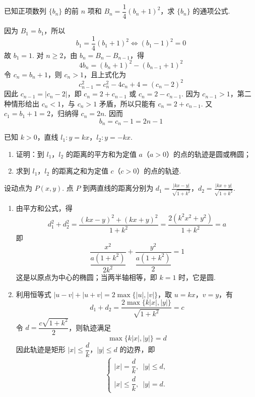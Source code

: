 \begin{problem}
已知正项数列 \(\{b_n\}\) 的前 \(n\) 项和 \(B_n=\dfrac14(b_n+1)^2\)，求 \(\{b_n\}\) 的通项公式.
\end{problem}

\begin{solution}
因为 \(B_1=b_1\)，所以
\[
b_1=\frac14(b_1+1)^2\Longleftrightarrow(b_1-1)^2=0
\]
故 \(b_1=1\). 对 \(n\geqslant2\)，由 \(b_n=B_n-B_{n-1}\)，得
\[
4b_n=(b_n+1)^2-(b_{n-1}+1)^2
\]
令 \(c_n=b_n+1\)，则 \(c_n>1\)，且上式化为
\[
c_{n-1}^2=c_n^2-4c_n+4=(c_n-2)^2
\]
因此 \(c_{n-1}=|c_n-2|\)，即 \(c_n=2+c_{n-1}\) 或 \(c_n=2-c_{n-1}\). 因为 \(c_{n-1}>1\)，第二种情形给出 \(c_n<1\)，与 \(c_n>1\) 矛盾，所以只能有 \(c_n=2+c_{n-1}\). 又 \(c_1=b_1+1=2\)，归纳得 \(c_n=2n\). 因而
\[
b_n=c_n-1=2n-1
\]
\end{solution}

\begin{problem}
已知 \(k>0\)，直线 \(l_1:y=kx\)，\(l_2:y=-kx\).
\begin{enumerate}
\item 证明：到 \(l_1\)，\(l_2\) 的距离的平方和为定值 \(a\)（\(a>0\)）的点的轨迹是圆或椭圆；
\item 求到 \(l_1\)，\(l_2\) 的距离之和为定值 \(c\)（\(c>0\)）的点的轨迹.
\end{enumerate}
\end{problem}

\begin{solution}
设动点为 \(P(x,y)\). 点 \(P\) 到两直线的距离分别为 \(d_1=\frac{|kx-y|}{\sqrt{1+k^2}}\)，\(d_2=\frac{|kx+y|}{\sqrt{1+k^2}}\).
\begin{enumerate}
\item 由平方和公式，得
\[
d_1^2+d_2^2
=\frac{(kx-y)^2+(kx+y)^2}{1+k^2}
=\frac{2(k^2x^2+y^2)}{1+k^2}=a
\]
即
\[
\frac{x^2}{\dfrac{a(1+k^2)}{2k^2}}+\frac{y^2}{\dfrac{a(1+k^2)}2}=1
\]
这是以原点为中心的椭圆；当两半轴相等，即 \(k=1\) 时，它是圆.

\item 利用恒等式 \(|u-v|+|u+v|=2\max\{|u|,|v|\}\)，取 \(u=kx\)，\(v=y\)，有
\[
d_1+d_2=\frac{2\max\{k|x|,|y|\}}{\sqrt{1+k^2}}=c
\]
令 \(d=\dfrac{c\sqrt{1+k^2}}2\)，则轨迹满足
\[
\max\{k|x|,|y|\}=d
\]
因此轨迹是矩形 \(|x|\leqslant\dfrac dk\)，\(|y|\leqslant d\) 的边界，即
\[
\begin{cases}
|x|=\dfrac dk,\enspace |y|\leqslant d,\\
|x|\leqslant\dfrac dk,\enspace |y|=d.
\end{cases}
\]
\end{enumerate}
\end{solution}

